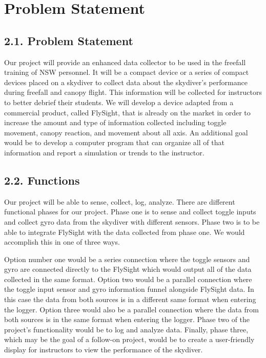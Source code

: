 \documentclass[10pt]{article}
\begin{document}
\section{Problem Statement}
\subsection{2.1. Problem Statement}
Our project will provide an enhanced data collector to be used in the freefall training of NSW personnel. It will be a compact device or a series of compact devices placed on a skydiver to collect data about the skydiver’s performance during freefall and canopy flight. This information will be collected for instructors to better debrief their students. We will develop a device adapted from a commercial product, called FlySight, that is already on the market in order to increase the amount and type of information collected including toggle movement, canopy reaction, and movement about all axis. An additional goal would be to develop a computer program that can organize all of that information and report a simulation or trends to the instructor.

\subsection{2.2. Functions}
Our project will be able to sense, collect, log, analyze. There are different functional phases for our project. Phase one is to sense and collect toggle inputs and collect gyro data from the skydiver with different sensors. Phase two is to be able to integrate FlySight with the data collected from phase one. We would accomplish this in one of three ways. 

Option number one would be a series connection where the toggle sensors and gyro are connected directly to the FlySight which would output all of the data collected in the same format. Option two would be a parallel connection where the toggle input sensor and gyro information funnel alongside FlySight data. In this case the data from both sources is in a different same format when entering the logger. Option three would also be a parallel connection where the data from both sources is in the same format when entering the logger. Phase two of the project’s functionality would be to log and analyze data. Finally, phase three, which may be the goal of a follow-on project, would be to create a user-friendly display for instructors to view the performance of the skydiver.
\end{document}
